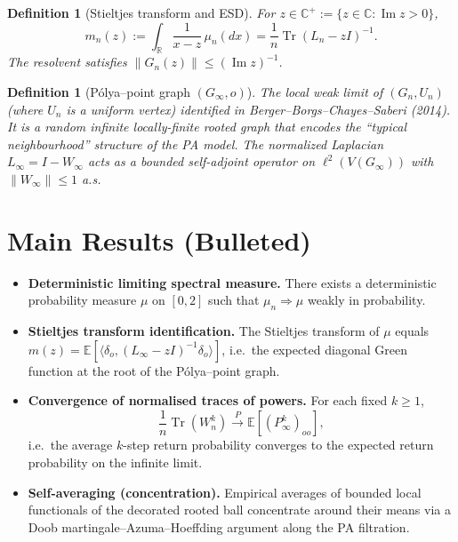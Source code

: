 \documentclass[11pt,a4paper]{article}
\newtheorem{definition}[theorem]{Definition}
\begin{document}
\begin{definition}[Stieltjes transform and ESD]
For $z\in\mathbb{C}^+ := \{z\in\mathbb{C}:\operatorname{Im} z>0\}$,
\[
  m_n(z) := \int_{\mathbb{R}}\frac{1}{x-z}\,\mu_n(dx) = \frac{1}{n}\operatorname{Tr}(L_n-zI)^{-1}.
\]
The resolvent satisfies $\|G_n(z)\|\le (\operatorname{Im} z)^{-1}$.
\end{definition}

\begin{definition}[P\'olya--point graph $(G_\infty,o)$]
The local weak limit of $(G_n, U_n)$ (where $U_n$ is a uniform vertex) identified in Berger--Borgs--Chayes--Saberi (2014). It is a random infinite locally-finite rooted graph that encodes the ``typical neighbourhood'' structure of the PA model. The normalized Laplacian $L_\infty = I - W_\infty$ acts as a bounded self-adjoint operator on $\ell^2(V(G_\infty))$ with $\|W_\infty\|\le 1$ a.s.
\end{definition}

\section{Main Results (Bulleted)}

\begin{itemize}
  \item \textbf{Deterministic limiting spectral measure.} There exists a deterministic probability measure $\mu$ on $[0,2]$ such that $\mu_n\Rightarrow\mu$ weakly in probability.
  \item \textbf{Stieltjes transform identification.} The Stieltjes transform of $\mu$ equals $m(z) = \mathbb{E}[\langle\delta_o,(L_\infty-zI)^{-1}\delta_o\rangle]$, i.e.\ the expected diagonal Green function at the root of the P\'olya--point graph.
  \item \textbf{Convergence of normalised traces of powers.} For each fixed $k\ge 1$,
  \[
    \frac{1}{n}\operatorname{Tr}(W_n^k) \xrightarrow{P} \mathbb{E}[(P_\infty^k)_{oo}],
  \]
  i.e.\ the average $k$-step return probability converges to the expected return probability on the infinite limit.
  \item \textbf{Self-averaging (concentration).} Empirical averages of bounded local functionals of the decorated rooted ball concentrate around their means via a Doob martingale--Azuma--Hoeffding argument along the PA filtration.
\end{itemize}
\end{document}
